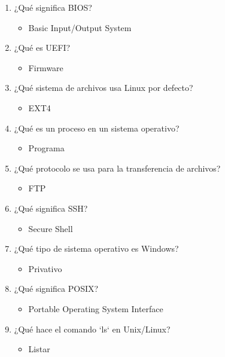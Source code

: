 \documentclass[11pt,twoside]{book}
\begin{document}
\begin{enumerate}[label=\textbf{\arabic*.}, leftmargin=2cm]
    \item ¿Qué significa BIOS? 
    \begin{itemize}
        \item Basic Input/Output System
    \end{itemize}

    \item ¿Qué es UEFI? 
    \begin{itemize}
        \item Firmware
    \end{itemize}

    \item ¿Qué sistema de archivos usa Linux por defecto? 
    \begin{itemize}
        \item EXT4
    \end{itemize}

    \item ¿Qué es un proceso en un sistema operativo? 
    \begin{itemize}
        \item Programa
    \end{itemize}

    \item ¿Qué protocolo se usa para la transferencia de archivos? 
    \begin{itemize}
        \item FTP
    \end{itemize}

    \item ¿Qué significa SSH? 
    \begin{itemize}
        \item Secure Shell
    \end{itemize}

    \item ¿Qué tipo de sistema operativo es Windows? 
    \begin{itemize}
        \item Privativo
    \end{itemize}

    \item ¿Qué significa POSIX? 
    \begin{itemize}
        \item Portable Operating System Interface
    \end{itemize}

    \item ¿Qué hace el comando `ls` en Unix/Linux? 
    \begin{itemize}
        \item Listar
    \end{itemize}


\end{enumerate}
\end{document}
